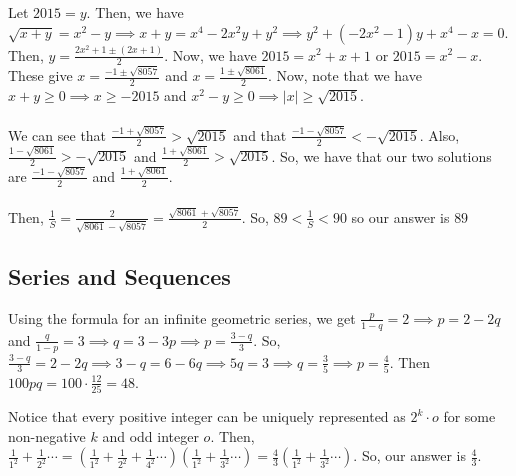 \documentclass[11pt]{article}
\begin{document}

\sol Let $2015=y$. Then, we have $\sqrt{x+y}=x^2-y\implies x+y=x^4-2x^2y+y^2\implies y^2+(-2x^2-1)y+x^4-x=0$. Then, $y=\frac{2x^2+1 \pm (2x+1)}{2}$. Now, we have $2015=x^2+x+1$ or $2015=x^2-x$. These give $x=\frac{-1 \pm \sqrt{8057}}{2}$ and $x=\frac{1 \pm \sqrt{8061}}{2}$. Now, note that we have $x+y\ge 0 \implies x \ge -2015$ and $x^2-y\ge 0\implies |x|\ge \sqrt{2015}$. \\
\\
We can see that $\frac{-1 + \sqrt{8057}}{2}>\sqrt{2015}$ and that $\frac{-1-\sqrt{8057}}{2} < -\sqrt{2015}$. Also, $\frac{1-\sqrt{8061}}{2} > - \sqrt{2015}$ and $\frac{1+\sqrt{8061}}{2} > \sqrt{2015}$. So, we have that our two solutions are $\frac{-1-\sqrt{8057}}{2}$ and $\frac{1+\sqrt{8061}}{2}$. \\
\\
Then, $\frac{1}{S}=\frac{2}{\sqrt{8061}-\sqrt{8057}}=\frac{\sqrt{8061}+\sqrt{8057}}{2}$. So, $89 < \frac{1}{S} < 90$ so our answer is $\boxed{89}$

\subsection{Series and Sequences}

\sol Using the formula for an infinite geometric series, we get $\frac{p}{1-q}=2\implies p=2-2q$ and $\frac{q}{1-p}=3\implies q=3-3p\implies p=\frac{3-q}{3}$. So, $\frac{3-q}{3}=2-2q\implies 3-q=6-6q\implies 5q=3\implies q =\frac{3}{5}\implies p =\frac{4}{5}$. Then $100pq=100\cdot \frac{12}{25}=\boxed{48}$.


\sol Notice that every positive integer can be uniquely represented as $2^{k}\cdot o$ for some non-negative $k$ and odd integer $o$. Then, $\frac{1}{1^2}+\frac{1}{2^2}\cdots = (\frac{1}{1^2}+\frac{1}{2^2}+\frac{1}{4^2}\cdots)(\frac{1}{1^2}+\frac{1}{3^2}\cdots) = \frac{4}{3}(\frac{1}{1^2} + \frac{1}{3^2}\cdots)$. So, our answer is $\boxed{\frac{4}{3}}$.
\end{document}
